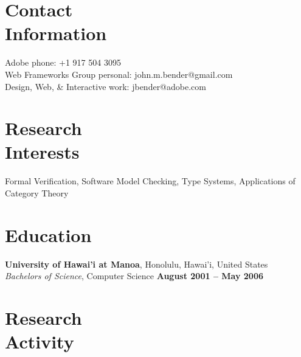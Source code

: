 \documentclass[margin,line]{resume}
\begin{document}
\begin{resume}

    \section{\mysidestyle Contact\\Information}

    Adobe                            \hfill phone: +1 917 504 3095           \vspace{0mm}\\\vspace{0mm}%
    Web Frameworks Group                          \hfill personal: john.m.bender@gmail.com          \vspace{0mm}\\\vspace{0mm}%
    Design, Web, \& Interactive                          \hfill work: jbender@adobe.com          \vspace{0mm}\\\vspace{0mm}%


    \section{\mysidestyle Research\\Interests}

    Formal Verification, Software Model Checking, Type Systems, Applications of Category Theory


    \section{\mysidestyle Education}

    \textbf{University of Hawai'i at Manoa}, Honolulu, Hawai'i, United States \vspace{2mm}\\\vspace{1mm}%
    \textsl{Bachelors of Science}, Computer Science \hfill \textbf{ August 2001 -- May 2006}\vspace{-3mm}\\\vspace{-1mm}%


    \section{\mysidestyle Research\\Activity}


\end{resume}
\end{document}

